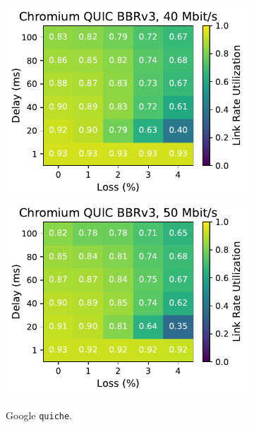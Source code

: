 \begin{figure}[ht]
\begin{subfigure}[b]{0.22\linewidth}
        \includegraphics[width=\linewidth,trim={0 0 2cm 0},clip]{splitting-paper/figures/heatmaps/heatmap_quic_bbr3_40mbps.pdf}
        \includegraphics[width=\linewidth,trim={0 0 2cm 0},clip]{splitting-paper/figures/heatmaps/heatmap_quic_bbr3_50mbps.pdf}
        \caption{Google \texttt{quiche}.}
    \end{subfigure}
    \begin{subfigure}[b]{0.22\linewidth}

\end{subfigure}
\end{figure}
